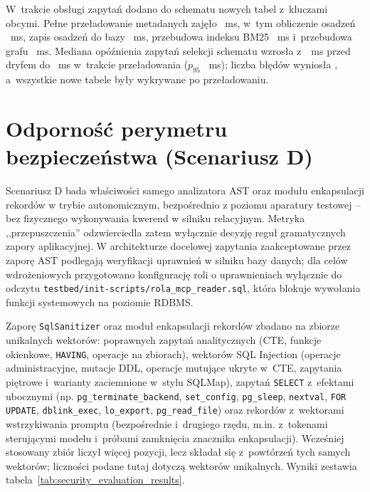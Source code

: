 W~trakcie obsługi zapytań dodano do schematu \wynDriftTables{} nowych tabel z~kluczami obcymi. Pełne przeładowanie metadanych zajęło \wynDriftTotal~ms, w~tym obliczenie osadzeń \wynDriftEmb~ms, zapis osadzeń do bazy \wynDriftIns~ms, przebudowa indeksu BM25 \wynDriftBm~ms i~przebudowa grafu \wynDriftGraph~ms. Mediana opóźnienia zapytań selekcji schematu wzrosła z~\wynDriftBase~ms przed dryfem do \wynDriftInflight~ms w~trakcie przeładowania ($p_{95}$ \wynDriftInflightPpp~ms); liczba błędów wyniosła \wynDriftErrors, a~wszystkie nowe tabele były wykrywane po przeładowaniu.


\section{Odporność perymetru bezpieczeństwa (Scenariusz D)}
\label{sec:wyniki_scenariusz_d}

Scenariusz D bada właściwości samego analizatora AST oraz modułu enkapsulacji rekordów w trybie autonomicznym, bezpośrednio z poziomu aparatury testowej -- bez fizycznego wykonywania kwerend w silniku relacyjnym. Metryka ,,przepuszczenia'' odzwierciedla zatem wyłącznie decyzję reguł gramatycznych zapory aplikacyjnej. W architekturze docelowej zapytania zaakceptowane przez zaporę AST podlegają weryfikacji uprawnień w silniku bazy danych; dla celów wdrożeniowych przygotowano konfigurację roli o uprawnieniach wyłącznie do odczytu \texttt{testbed/init-scripts/rola\_mcp\_reader.sql}, która blokuje wywołania funkcji systemowych na poziomie RDBMS.

Zaporę \texttt{SqlSanitizer} oraz moduł enkapsulacji rekordów zbadano na zbiorze \wynSecTotal{} unikalnych wektorów: \wynSecAnalytic{} poprawnych zapytań analitycznych (CTE, funkcje okienkowe, \texttt{HAVING}, operacje na zbiorach), \wynSecInjection{} wektorów SQL Injection (operacje administracyjne, mutacje DDL, operacje mutujące ukryte w~CTE, zapytania piętrowe i~warianty zaciemnione w~stylu SQLMap), \wynSecSideEffect{} zapytań \texttt{SELECT} z~efektami ubocznymi (np. \texttt{pg\_terminate\_backend}, \texttt{set\_config}, \texttt{pg\_sleep}, \texttt{nextval}, \texttt{FOR UPDATE}, \texttt{dblink\_exec}, \texttt{lo\_export}, \texttt{pg\_read\_file}) oraz \wynSecPrompt{} rekordów z~wektorami wstrzykiwania promptu (bezpośrednie i~drugiego rzędu, m.in. z~tokenami sterującymi modelu i~próbami zamknięcia znacznika enkapsulacji). Wcześniej stosowany zbiór liczył więcej pozycji, lecz składał się z~powtórzeń tych samych wektorów; liczności podane tutaj dotyczą wektorów unikalnych. Wyniki zestawia tabela~\ref{tab:security_evaluation_results}.

